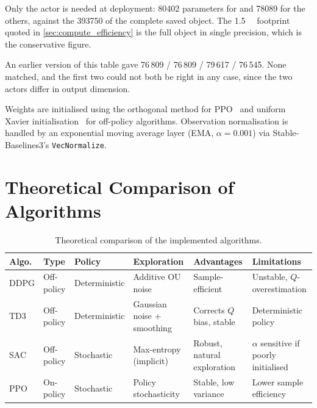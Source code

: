 Only the actor is needed at deployment: \SI{80402}{} parameters for \SAC{} and
\SI{78089}{} for the others, against the \SI{393750}{} of the complete saved
object. The \SI{1.5}{\mega\byte} footprint quoted in
\cref{sec:compute_efficiency} is the full object in single precision, which is
the conservative figure.

An earlier version of this table gave 76\,809 / 76\,809 / 79\,617 / 76\,545.
None matched, and the first two could not both be right in any case, since the
two actors differ in output dimension.

Weights are initialised using the orthogonal method for PPO~\parencite{Schulman2017}
and uniform Xavier initialisation~\parencite{Glorot2010} for off-policy algorithms.
Observation normalisation is handled by an exponential moving average layer
(EMA, $\alpha = 0.001$) via Stable-Baselines3's \texttt{VecNormalize}.

\section{Theoretical Comparison of Algorithms}

\begin{table}[H]
  \centering
  \caption{Theoretical comparison of the implemented \DRL{} algorithms.}
  \label{tab:algo_compare}
  \small
  \begin{tabularx}{\textwidth}{@{} L{1.6cm} L{1.6cm} L{2.2cm} L{2.5cm} X L{2.2cm} @{}}
    \toprule
    \textbf{Algo.} & \textbf{Type} & \textbf{Policy} & \textbf{Exploration} &
    \textbf{Advantages} & \textbf{Limitations} \\
    \midrule
    DDPG & Off-policy & Deterministic & Additive OU noise        &
          Sample-efficient & Unstable, $Q$-overestimation \\
    TD3  & Off-policy & Deterministic & Gaussian noise + smoothing &
          Corrects $Q$ bias, stable & Deterministic policy \\
    SAC  & Off-policy & Stochastic    & Max-entropy (implicit)   &
          Robust, natural exploration & $\alpha$ sensitive if poorly initialised \\
    PPO  & On-policy  & Stochastic    & Policy stochasticity     &
          Stable, low variance & Lower sample efficiency \\
    \bottomrule
  \end{tabularx}
  \normalsize
\end{table}

